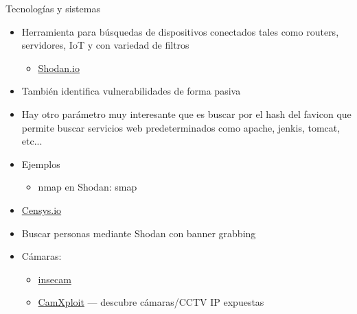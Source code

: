 \documentclass[aspectratio=169,11pt]{beamer}
\begin{document}
\begin{frame}[allowframebreaks]{Tecnologías y sistemas}
\small
  \begin{itemize}
  \item Herramienta para búsquedas de dispositivos conectados tales como routers, servidores, IoT y con variedad de filtros
    \begin{itemize}
  \item \href{https://www.shodan.io/}{Shodan.io}
  \end{itemize}

  \item También identifica vulnerabilidades de forma pasiva
  \item Hay otro parámetro muy interesante que es buscar por el hash del favicon que permite buscar servicios web predeterminados como apache, jenkis, tomcat, etc...

  \item Ejemplos
  \begin{itemize}

  \item nmap en Shodan: smap
    \end{itemize}


  \item \href{https://search.censys.io/}{Censys.io}

  \item Buscar personas mediante Shodan con banner grabbing
  \item Cámaras:
 \begin{itemize}

  \item \href{http://www.insecam.org/}{insecam}
  \item \href{https://www.linkedin.com/posts/vicentegarrigues-trenor_cybersecurity-hackingaeztico-osint-ugcPost-7340848658659045376-mFBu/}{CamXploit} --- descubre cámaras/CCTV IP expuestas
  \end{itemize}

  \end{itemize}
\end{frame}
\end{document}
